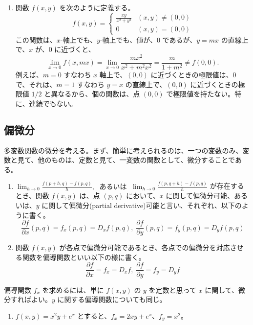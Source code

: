 \begin{eg}
\begin{enumerate}
\item 関数 $f(x,y)$ を次のように定義する。
$$f(x,y) = \left\{\begin{array}{ll} \frac{xy}{x^2+y^2}& (x,y) \neq (0,0) \\ 0 & (x,y) = (0,0)\end{array} \right.$$
この関数は、$x$-軸上でも、$y$-軸上でも、値が、$0$ であるが、$y = mx$ の直線上で、$x$ が、$0$  に近づくと、
$$\lim_{x\to 0}f(x,mx) = \lim_{x\to 0}\frac{mx^2}{x^2 + m^2x^2} = \frac{m}{1+m^2} \neq f(0,0).$$
例えば、$m = 0$ すなわち $x$ 軸上で、$(0,0)$ に近づくときの極限値は、$0$ で、それは、$m=1$ すなわち $y = x$ の直線上で、$(0,0)$ に近づくときの極限値 $1/2$ と異なるから、個の関数は、点 $(0,0)$ で極限値を持たない。特に、連続でもない。
\end{enumerate}
\end{eg}

\subsection{偏微分}
多変数関数の微分を考える。まず、簡単に考えられるのは、一つの変数のみ、変数と見て、他のものは、定数と見て、一変数の関数として、微分することである。

\begin{definition}
\begin{enumerate}
\item ${\displaystyle \lim_{h\to 0}\frac{f(p+h,q)-f(p,q)}h,\;\mbox{ あるいは }\;\lim_{h\to 0}\frac{f(p,q+h)-f(p,q)}h}$
が存在するとき、関数 $f(x,y)$ は、点 $(p,q)$  において、$x$ に関して偏微分可能、あるいは、$y$ に関して偏微分(partial derivative)可能と言い、それぞれ、以下のように書く。
$$\frac{\partial f}{\partial x}(p,q) = f_x(p,q) = D_xf(p,q), \;\frac{\partial f}{\partial y}(p,q) = f_y(p,q) = D_yf(p,q)$$
\item 関数 $f(x,y)$ が各点で偏微分可能であるとき、各点での偏微分を対応させる関数を偏導関数といい以下の様に書く。
$$\frac{\partial f}{\partial x} = f_x= D_xf, \;\frac{\partial f}{\partial y}= f_y = D_yf$$
\end{enumerate}
\end{definition}

偏導関数 $f_x$ を求めるには、単に $f(x,y)$ の $y$ を定数と思って $x$ に関して、微分すればよい。$y$ に関する偏導関数についても同じ。

\begin{eg}
\begin{enumerate}
\item $f(x,y) = x^2y + e^x$ とすると、$f_x = 2xy + e^x$、$f_y = x^2$。
\end{enumerate}
\end{eg}

